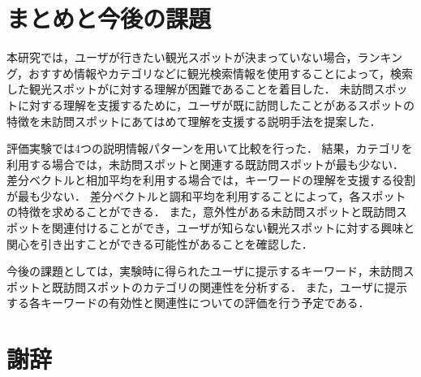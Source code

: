 \documentclass{deimj}
\begin{document}
\section{まとめと今後の課題}
\label{sec:まとめと今後の課題}
本研究では，ユーザが行きたい観光スポットが決まっていない場合，ランキング，おすすめ情報やカテゴリなどに観光検索情報を使用することによって，検索した観光スポットがに対する理解が困難であることを着目した．
未訪問スポットに対する理解を支援するために，ユーザが既に訪問したことがあるスポットの特徴を未訪問スポットにあてはめて理解を支援する説明手法を提案した．

評価実験では4つの説明情報パターンを用いて比較を行った．
結果，カテゴリを利用する場合では，未訪問スポットと関連する既訪問スポットが最も少ない．
差分ベクトルと相加平均を利用する場合では，キーワードの理解を支援する役割が最も少ない．
差分ベクトルと調和平均を利用することによって，各スポットの特徴を求めることができる．
また，意外性がある未訪問スポットと既訪問スポットを関連付けることができ，ユーザが知らない観光スポットに対する興味と関心を引き出すことができる可能性があることを確認した．

今後の課題としては，実験時に得られたユーザに提示するキーワード，未訪問スポットと既訪問スポットのカテゴリの関連性を分析する．
また，ユーザに提示する各キーワードの有効性と関連性についての評価を行う予定である．


\section*{謝辞}
\end{document}
